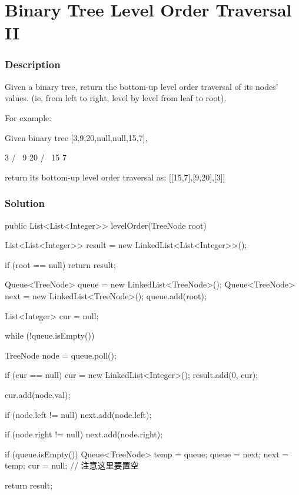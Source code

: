 \newpage

\section{Binary Tree Level Order Traversal II} %

\subsubsection{Description}
Given a binary tree, return the bottom-up level order traversal of its nodes' values. (ie, from left to right, level by level from leaf to root).

For example:

Given binary tree [3,9,20,null,null,15,7],
\begin{Code}
    3
   / \
  9  20
    /  \
   15   7
\end{Code}

return its bottom-up level order traversal as: [[15,7],[9,20],[3]]

\subsubsection{Solution}

\begin{Code}
public List<List<Integer>> levelOrder(TreeNode root) {
    List<List<Integer>> result = new LinkedList<List<Integer>>();

    if (root == null) { return result;}

    Queue<TreeNode> queue = new LinkedList<TreeNode>();
    Queue<TreeNode> next = new LinkedList<TreeNode>();
    queue.add(root);

    List<Integer> cur = null;

    while (!queue.isEmpty()) {
        TreeNode node = queue.poll();

        if (cur == null) {
            cur = new LinkedList<Integer>();
            result.add(0, cur);
        }

        cur.add(node.val);

        if (node.left != null) {
            next.add(node.left);
        }

        if (node.right != null) {
            next.add(node.right);
        }

        if (queue.isEmpty()) {
            Queue<TreeNode> temp = queue;
            queue = next;
            next = temp;
            cur = null; // 注意这里要置空
        }
    }
    return result;
}
\end{Code}

